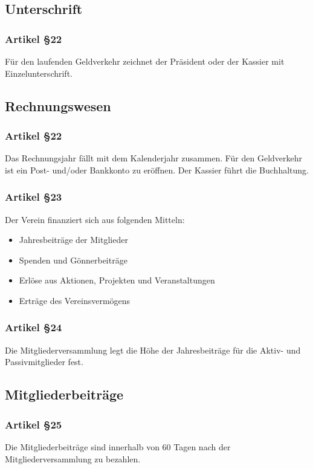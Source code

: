 \documentclass[a4paper,10pt,fleqn]{article}
\begin{document}
\subsection{Unterschrift}

\subsubsection*{Artikel §22}
Für den laufenden Geldverkehr zeichnet der Präsident oder 
der Kassier mit Einzelunterschrift.

\subsection{Rechnungswesen}

\subsubsection*{Artikel §22}
Das Rechnungsjahr fällt mit dem Kalenderjahr zusammen. Für
den Geldverkehr ist ein Post- und/oder Bankkonto zu
eröffnen. Der Kassier führt die Buchhaltung.

\subsubsection*{Artikel §23}
Der Verein finanziert sich aus folgenden Mitteln:
\begin{itemize}
\item Jahresbeiträge der Mitglieder
\item Spenden und Gönnerbeiträge
\item Erlöse aus Aktionen, Projekten und Veranstaltungen
\item Erträge des Vereinsvermögens
\end{itemize}
 
\subsubsection*{Artikel §24}
Die Mitgliederversammlung legt die Höhe der Jahresbeiträge 
für die Aktiv- und Passivmitglieder fest.

\subsection{Mitgliederbeiträge}

\subsubsection*{Artikel §25}
Die Mitgliederbeiträge sind innerhalb von 60 Tagen nach der 
Mitgliederversammlung zu bezahlen.
\end{document}

